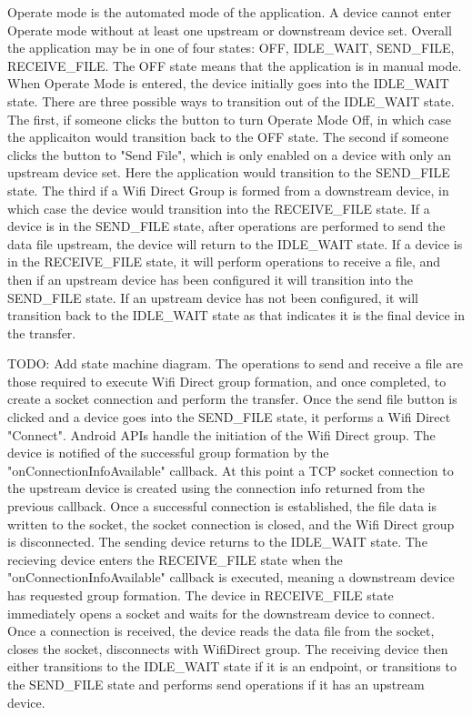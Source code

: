 \documentclass[10pt,twocolumn]{article}
\begin{document}
Operate mode is the automated mode of the application.
A device cannot enter Operate mode without at least one upstream or downstream device set.
Overall the application may be in one of four states: OFF, IDLE\_WAIT, SEND\_FILE, RECEIVE\_FILE.
The OFF state means that the application is in manual mode.
When Operate Mode is entered, the device initially goes into the IDLE\_WAIT state.
There are three possible ways to transition out of the IDLE\_WAIT state.
The first, if someone clicks the button to turn Operate Mode Off, in which case the applicaiton would transition back to the OFF state.
The second if someone clicks the button to "Send File", which is only enabled on a device with only an upstream device set.
Here the application would transition to the SEND\_FILE state.
The third if a Wifi Direct Group is formed from a downstream device, in which case the device would transition into the RECEIVE\_FILE state.
If a device is in the SEND\_FILE state, after operations are performed to send the data file upstream, the device will return to the IDLE\_WAIT state.
If a device is in the RECEIVE\_FILE state, it will perform operations to receive a file, and then if an upstream device has been configured it will transition into the SEND\_FILE state.
If an upstream device has not been configured, it will transition back to the IDLE\_WAIT state as that indicates it is the final device in the transfer.

TODO: Add state machine diagram.  
The operations to send and receive a file are those required to execute Wifi Direct group formation, and once completed, to create a socket connection and perform the transfer. 
Once the send file button is clicked and a device goes into the SEND\_FILE state, it performs a Wifi Direct "Connect". 
Android APIs handle the initiation of the Wifi Direct group.
The device is notified of the successful group formation by the "onConnectionInfoAvailable" callback.
At this point a TCP socket connection to the upstream device is created using the connection info returned from the previous callback.
Once a successful connection is established, the file data is written to the socket, the socket connection is closed, and the Wifi Direct group is disconnected.
The sending device returns to the IDLE\_WAIT state.
The recieving device enters the RECEIVE\_FILE state when the "onConnectionInfoAvailable" callback is executed, meaning a downstream device has requested group formation.
The device in RECEIVE\_FILE state immediately opens a socket and waits for the downstream device to connect.
Once a connection is received, the device reads the data file from the socket, closes the socket, disconnects with WifiDirect group.
The receiving device then either transitions to the IDLE\_WAIT state if it is an endpoint, or transitions to the SEND\_FILE state and performs send operations if it has an upstream device.
\end{document}

